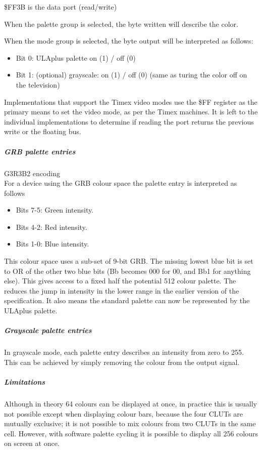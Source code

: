 \$FF3B is the data port (read/write)

When the palette group is selected, the byte written will describe the
color.

When the mode group is selected, the byte output will be interpreted
as follows:
\begin{itemize}
\item Bit 0: ULAplus palette on (1) / off (0)
\item Bit 1: (optional) grayscale: on (1) / off (0) (same as turing
  the color off on the television)
\end{itemize}

Implementations that support the Timex video modes use the \$FF
register as the primary means to set the video mode, as per the Timex
machines. It is left to the individual implementations to determine if
reading the port returns the previous write or the floating bus.

\subparagraph{GRB palette entries}

G3R3B2 encoding\\
For a device using the GRB colour space the palette entry is
interpreted as follows
\begin{itemize}
\item Bits 7-5: Green intensity.
\item Bits 4-2: Red intensity.
\item Bits 1-0: Blue intensity.
\end{itemize}

This colour space uses a sub-set of 9-bit GRB. The missing lowest blue
bit is set to OR of the other two blue bits (Bb becomes 000 for 00,
and Bb1 for anything else). This gives access to a fixed half the
potential 512 colour palette. The reduces the jump in intensity in the
lower range in the earlier version of the specification. It also means
the standard palette can now be represented by the ULAplus palette.

\subparagraph{Grayscale palette entries}
In grayscale mode, each palette entry describes an intensity from zero
to 255. This can be achieved by simply removing the colour from the
output signal.

\subparagraph{Limitations}
Although in theory 64 colours can be displayed at once, in practice
this is usually not possible except when displaying colour bars,
because the four CLUTs are mutually exclusive; it is not possible to
mix colours from two CLUTs in the same cell. However, with software
palette cycling it is possible to display all 256 colours on screen at
once.

